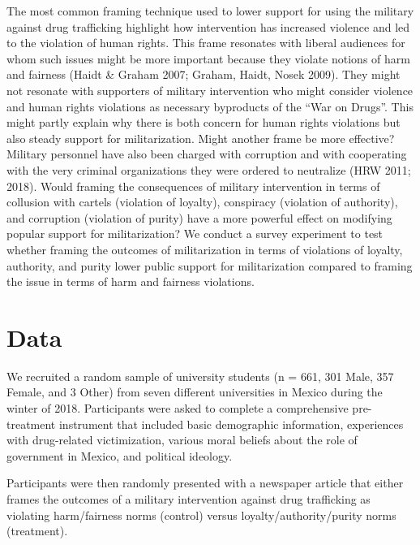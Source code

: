 \documentclass[
  12pt,
]{article}
\begin{document}
The most common framing technique used to lower support for using the
military against drug trafficking highlight how intervention has
increased violence and led to the violation of human rights. This frame
resonates with liberal audiences for whom such issues might be more
important because they violate notions of harm and fairness (Haidt \&
Graham 2007; Graham, Haidt, Nosek 2009). They might not resonate with
supporters of military intervention who might consider violence and
human rights violations as necessary byproducts of the ``War on Drugs''.
This might partly explain why there is both concern for human rights
violations but also steady support for militarization. Might another
frame be more effective? Military personnel have also been charged with
corruption and with cooperating with the very criminal organizations
they were ordered to neutralize (HRW 2011; 2018). Would framing the
consequences of military intervention in terms of collusion with cartels
(violation of loyalty), conspiracy (violation of authority), and
corruption (violation of purity) have a more powerful effect on
modifying popular support for militarization? We conduct a survey
experiment to test whether framing the outcomes of militarization in
terms of violations of loyalty, authority, and purity lower public
support for militarization compared to framing the issue in terms of
harm and fairness violations.

\hypertarget{data}{%
\section{Data}\label{data}}

We recruited a random sample of university students (n = 661, 301 Male,
357 Female, and 3 Other) from seven different universities in Mexico
during the winter of 2018. Participants were asked to complete a
comprehensive pre-treatment instrument that included basic demographic
information, experiences with drug-related victimization, various moral
beliefs about the role of government in Mexico, and political ideology.

Participants were then randomly presented with a newspaper article that
either frames the outcomes of a military intervention against drug
trafficking as violating harm/fairness norms (control) versus
loyalty/authority/purity norms (treatment).
\end{document}
